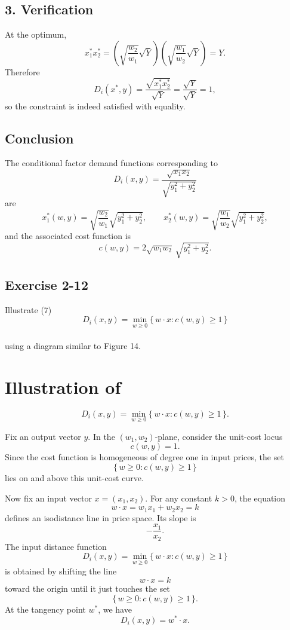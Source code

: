 \subsection*{3. Verification}

At the optimum,
\[
x_1^*x_2^*
=
\left(\sqrt{\frac{w_2}{w_1}}\sqrt{Y}\right)
\left(\sqrt{\frac{w_1}{w_2}}\sqrt{Y}\right)
=
Y.
\]
Therefore
\[
D_i(x^*,y)
=
\frac{\sqrt{x_1^*x_2^*}}{\sqrt{Y}}
=
\frac{\sqrt{Y}}{\sqrt{Y}}
=
1,
\]
so the constraint is indeed satisfied with equality.

\subsection*{Conclusion}

The conditional factor demand functions corresponding to
\[
D_i(x,y)=\frac{\sqrt{x_1x_2}}{\sqrt{y_1^2+y_2^2}}
\]
are
\[
\boxed{
x_1^*(w,y)=\sqrt{\frac{w_2}{w_1}}\sqrt{y_1^2+y_2^2},
\qquad
x_2^*(w,y)=\sqrt{\frac{w_1}{w_2}}\sqrt{y_1^2+y_2^2},
}
\]
and the associated cost function is
\[
\boxed{
c(w,y)=2\sqrt{w_1w_2}\,\sqrt{y_1^2+y_2^2}.
}
\]




\vspace{30pt}
\begin{tcolorbox}[breakable]

\subsection*{Exercise 2-12}

Illustrate (7) 
\[
D_i(x,y)=\min_{w \ge 0}\{\,w \cdot x : c(w,y)\ge 1\,\}
\]\\
using a diagram similar to Figure 14.

\end{tcolorbox}


\section*{Illustration of}
\[
D_i(x,y)=\min_{w\ge 0}\{\,w\cdot x : c(w,y)\ge 1\,\}.
\]

Fix an output vector \(y\). In the \((w_1,w_2)\)-plane, consider the unit-cost locus
\[
c(w,y)=1.
\]
Since the cost function is homogeneous of degree one in input prices, the set
\[
\{\,w\ge 0 : c(w,y)\ge 1\,\}
\]
lies on and above this unit-cost curve.

Now fix an input vector \(x=(x_1,x_2)\).  
For any constant \(k>0\), the equation
\[
w\cdot x=w_1x_1+w_2x_2=k
\]
defines an isodistance line in price space. Its slope is
\[
-\frac{x_1}{x_2}.
\]
The input distance function
\[
D_i(x,y)=\min_{w\ge 0}\{\,w\cdot x : c(w,y)\ge 1\,\}
\]
is obtained by shifting the line
\[
w\cdot x=k
\]
toward the origin until it just touches the set
\[
\{\,w\ge 0 : c(w,y)\ge 1\,\}.
\]
At the tangency point \(w^*\), we have
\[
D_i(x,y)=w^*\cdot x.
\]

